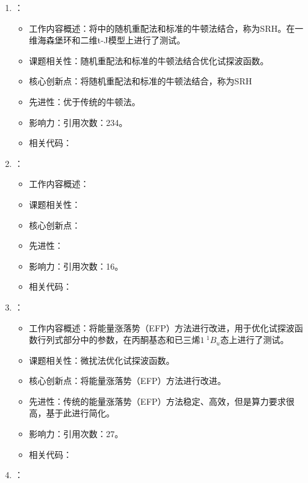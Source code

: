 \begin{enumerate}
\begin{itemize}
            \end{itemize}
            \item \citet{sorella2005wave}：
            \begin{itemize}
                \item 工作内容概述：将\citet{casula2004correlated}中的随机重配法和标准的牛顿法结合，称为SRH。在一维海森堡环和二维t-J模型上进行了测试。
                \item 课题相关性：随机重配法和标准的牛顿法结合优化试探波函数。
                \item 核心创新点：将随机重配法和标准的牛顿法结合，称为SRH
                \item 先进性：优于传统的牛顿法。
                \item 影响力：引用次数：234。
                \item 相关代码：
            \end{itemize}
            \item \citet{schmidt2005green}：
            \begin{itemize}
                \item 工作内容概述：
                \item 课题相关性：
                \item 核心创新点：
                \item 先进性：
                \item 影响力：引用次数：16。
                \item 相关代码：
            \end{itemize}
        \item \citet{scemama2006simple}：
            \begin{itemize}
                \item 工作内容概述：将能量涨落势（EFP）方法进行改进，用于优化试探波函数行列式部分中的参数，在丙酮基态和已三烯$1~^{1}B_u$态上进行了测试。
                \item 课题相关性：微扰法优化试探波函数。
                \item 核心创新点：将能量涨落势（EFP）方法进行改进。
                \item 先进性：传统的能量涨落势（EFP）方法稳定、高效，但是算力要求很高，基于此进行简化。
                \item 影响力：引用次数：27。
                \item 相关代码：
            \end{itemize}
        \item \citet{sorella2007weak}：

\end{enumerate}
